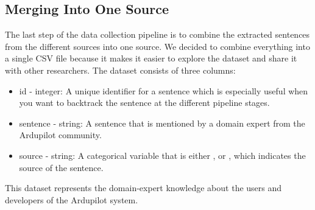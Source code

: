 \subsection{Merging Into One Source}\label{subsec:merging-to-one-source}
The last step of the data collection pipeline is to combine the extracted sentences from the different sources into one source.
We decided to combine everything into a single CSV file because it makes it easier to explore the dataset and share it with other researchers.
The dataset consists of three columns:
\begin{itemize}
    \item id - integer: A unique identifier for a sentence which is especially useful when you want to backtrack the sentence at the different pipeline stages.
    \item sentence - string: A sentence that is mentioned by a domain expert from the Ardupilot community.
    \item source - string: A categorical variable that is either ,  or , which indicates the source of the sentence.
\end{itemize}
This dataset represents the domain-expert knowledge about the users and developers of the Ardupilot system.
